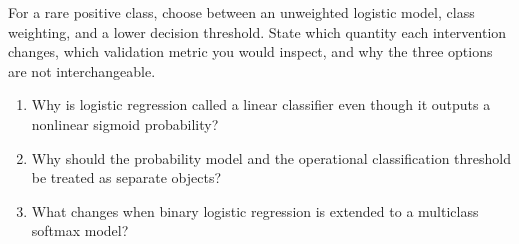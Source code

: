 \begin{decisionmemo}
For a rare positive class, choose between an unweighted logistic model, class weighting, and a lower decision threshold. State which quantity each intervention changes, which validation metric you would inspect, and why the three options are not interchangeable.
\end{decisionmemo}



\begin{quickcheck}
\begin{enumerate}
  \item Why is logistic regression called a linear classifier even though it outputs a nonlinear sigmoid probability?
  \item Why should the probability model and the operational classification threshold be treated as separate objects?
  \item What changes when binary logistic regression is extended to a multiclass softmax model?
\end{enumerate}
\end{quickcheck}
